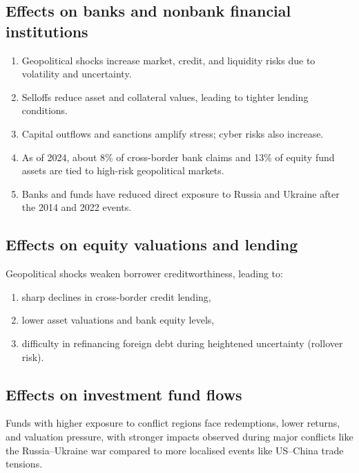 \subsection*{Effects on banks and nonbank financial institutions}

\begin{enumerate}[label=\textbf{\alph*)}]
\item Geopolitical shocks increase market, credit, and liquidity risks due to volatility and
uncertainty.
\item Selloffs reduce asset and collateral values, leading to tighter lending conditions.
\item Capital outflows and sanctions amplify stress; cyber risks also increase.
\item As of 2024, about 8\% of cross-border bank claims and 13\% of equity fund assets are
tied to high-risk geopolitical markets.
\item Banks and funds have reduced direct exposure to Russia and Ukraine after the 2014 and
2022 events.
\end{enumerate}

\subsection*{Effects on equity valuations and lending}

Geopolitical shocks weaken borrower creditworthiness, leading to:

\begin{enumerate}[label=\textbf{\alph*)}]
\item sharp declines in cross-border credit lending,
\item lower asset valuations and bank equity levels,
\item difficulty in refinancing foreign debt during heightened uncertainty (rollover risk).
\end{enumerate}

\subsection*{Effects on investment fund flows}

Funds with higher exposure to conflict regions face redemptions, lower returns, and valuation
pressure, with stronger impacts observed during major conflicts like the Russia--Ukraine war
compared to more localised events like US--China trade tensions.

